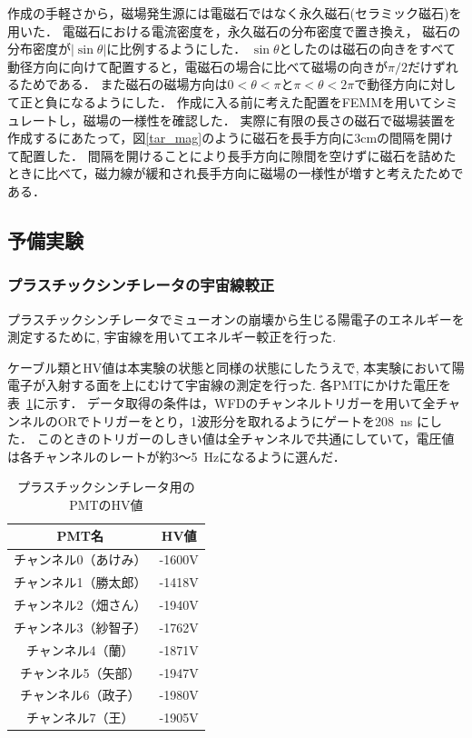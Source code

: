 作成の手軽さから，磁場発生源には電磁石ではなく永久磁石(セラミック磁石)を用いた．
電磁石における電流密度を，永久磁石の分布密度で置き換え，
磁石の分布密度が$|\sin\theta|$に比例するようにした．
$\sin\theta$としたのは磁石の向きをすべて動径方向に向けて配置すると，電磁石の場合に比べて磁場の向きが$\pi/2$だけずれるためである．
また磁石の磁場方向は$0<\theta<\pi$と$\pi<\theta<2\pi$で動径方向に対して正と負になるようにした．
作成に入る前に考えた配置をFEMMを用いてシミュレートし，磁場の一様性を確認した．
実際に有限の長さの磁石で磁場装置を作成するにあたって，図\ref{tar_mag}のように磁石を長手方向に$3\mathrm{cm}$の間隔を開けて配置した．
間隔を開けることにより長手方向に隙間を空けずに磁石を詰めたときに比べて，磁力線が緩和され長手方向に磁場の一様性が増すと考えたためである．

\newpage
\subsection{予備実験}
\subsubsection{プラスチックシンチレータの宇宙線較正}
プラスチックシンチレータでミューオンの崩壊から生じる陽電子のエネルギーを測定するために, 宇宙線を用いてエネルギー較正を行った.

ケーブル類とHV値は本実験の状態と同様の状態にしたうえで,
本実験において陽電子が入射する面を上にむけて宇宙線の測定を行った.
各PMTにかけた電圧を表~\ref{PS_PMT_HV}に示す．
データ取得の条件は，WFDのチャンネルトリガーを用いて全チャンネルのORでトリガーをとり，1波形分を取れるようにゲートを208~ns にした．
このときのトリガーのしきい値は全チャンネルで共通にしていて，電圧値は各チャンネルのレートが約3〜5~Hzになるように選んだ．
 \begin{table}[H]
  \caption{プラスチックシンチレータ用のPMTのHV値}
  \label{PS_PMT_HV}
  \begin{center}
   \begin{tabular}{cc}\toprule
    PMT名&HV値 \\ \hline
    チャンネル0（あけみ）&-1600V \\
    チャンネル1（勝太郎）&-1418V \\
    チャンネル2（畑さん）&-1940V \\
    チャンネル3（紗智子）&-1762V \\
    チャンネル4（蘭）  &-1871V \\
    チャンネル5（矢部） &-1947V \\
    チャンネル6（政子） &-1980V \\
    チャンネル7（王）  &-1905V \\ \bottomrule
   \end{tabular} 
  \end{center}
 \end{table}%

